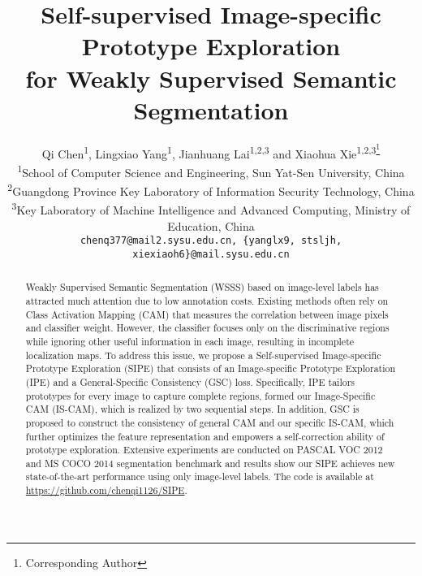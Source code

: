 \documentclass[10pt,twocolumn,letterpaper]{article}
\begin{document}
\title{Self-supervised Image-specific Prototype Exploration \\for Weakly Supervised Semantic Segmentation}

\author{Qi Chen\textsuperscript{1}, Lingxiao Yang\textsuperscript{1}, Jianhuang Lai\textsuperscript{1,2,3} and Xiaohua Xie\textsuperscript{1,2,3\thanks{Corresponding Author}}\\
\textsuperscript{1}School of Computer Science and Engineering, Sun Yat-Sen University, China\\
\textsuperscript{2}Guangdong Province Key Laboratory of Information Security Technology, China\\
\textsuperscript{3}Key Laboratory of Machine Intelligence and Advanced Computing, Ministry of Education, China\\
{\tt\small chenq377@mail2.sysu.edu.cn, \{yanglx9, stsljh, xiexiaoh6\}@mail.sysu.edu.cn}

}
\maketitle

\begin{abstract}
Weakly Supervised Semantic Segmentation (WSSS) based on image-level labels has attracted much attention due to low annotation costs.
Existing methods often rely on Class Activation Mapping (CAM) that measures the correlation between image pixels and classifier weight.
However, the classifier focuses only on the discriminative regions while ignoring other useful information in each image, resulting in incomplete localization maps.
To address this issue, we propose a Self-supervised Image-specific Prototype Exploration (SIPE) that consists of an Image-specific Prototype Exploration (IPE) and a General-Specific Consistency (GSC) loss.
Specifically, IPE tailors prototypes for every image to capture complete regions, formed our Image-Specific CAM (IS-CAM), which is realized by two sequential steps.
In addition, GSC is proposed to construct the consistency of general CAM and our specific IS-CAM, which further optimizes the feature representation and empowers a self-correction ability of prototype exploration.
Extensive experiments are conducted on PASCAL VOC 2012 and MS COCO 2014 segmentation benchmark and results show our SIPE achieves new state-of-the-art performance using only image-level labels.
The code is available at \url{https://github.com/chenqi1126/SIPE}.
\end{abstract}
\end{document}
